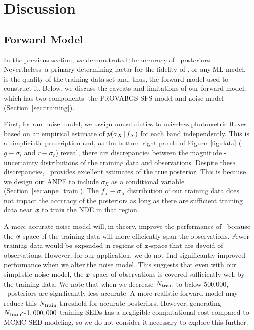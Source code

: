 \section{Discussion} \label{sec:discuss}
\subsection{Forward Model} \label{sec:forward-model}
In the previous section, we demonstrated the accuracy of \sedflow~posteriors. 
Nevertheless, a primary determining factor for the fidelity of \sedflow, or any
ML model, is the quality of the training data set and, thus, the forward model
used to construct it. 
Below, we discuss the caveats and limitations of our forward model, which has
two components: the PROVABGS SPS model and noise model 
(Section~\ref{sec:training}).

First, for our noise model, we assign uncertainties to noiseless photometric
fluxes based on an empirical estimate of $p(\sigma_X\,|\, f_X)$ for each band
independently. 
This is a simplicistic prescription and, as the bottom right panels of
Figure~\ref{fig:data} ($g - \sigma_r$ and $r - \sigma_r$) reveal, there are
discrepancies between the magnitude - uncertainty distributions of the training
data and observations. 
Despite these discrepancies, \sedflow~provides excellent estimates of the true
posterior.  
This is because we design our ANPE to include $\sigma_X$ as a conditional
variable (Section~\ref{sec:anpe_train}).
The $f_X-\sigma_X$ distribution of our training data does not impact the
accuracy of the posteriors as long as there are sufficient training data near
$\textbf{\textit{x}}$ to train the NDE in that region.

A more accurate noise model will, in theory, improve the performance of
\sedflow~because the $\textbf{\textit{x}}$-space of the training data will more efficiently 
span the observations. 
Fewer training data would be expended in regions of $\textbf{\textit{x}}$-space that are
devoid of observations.  
However, for our application, we do not find significantly  
improved performance when we alter the noise model.
This suggests that even with our simplistic noise model, the $\textbf{\textit{x}}$-space of
observations is covered sufficiently well by the training data. 
We note that when we decrease $N_{\rm train}$ to below 500,000,
\sedflow~posteriors are significantly less accurate. 
A more realistic forward model may reduce this $N_{\rm train}$ threshold for
accurate posteriors. 
However, generating $N_{\rm train}{\sim}1,000,000$ training SEDs has a
negligible computational cost compared to MCMC SED modeling, so we do not
consider it necessary to explore this further. 

